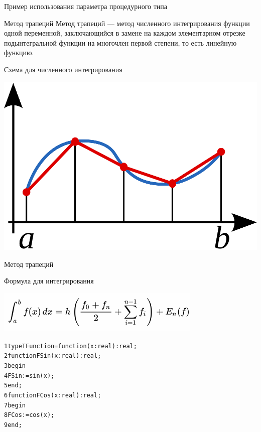 \documentclass{beamer}
\begin{document}
\begin{frame}[fragile]{Пример использования параметра процедурного типа}
\begin{block}{Метод трапеций}
Метод трапеций — метод численного интегрирования функции одной переменной, заключающийся в замене на каждом элементарном отрезке подынтегральной функции на многочлен первой степени, то есть линейную функцию. 
\end{block}
\begin{block}{Схема для численного интегрирования}
\begin{center}
\includegraphics[scale=0.15]{images/trap.png}
\end{center}
\end{block}
\end{frame}

\begin{frame}[fragile]{Метод трапеций}
\begin{block}{Формула для интегрирования}
\begin{center}
\includegraphics[scale=0.5]{images/formula.png}
\end{center}
\end{block}
\begin{alltt}
 1 type TFunction = function(x:real):real;
 2 function FSin(x: real):real;
 3 begin
 4   FSin := sin(x);
 5 end;
 6 function FCos(x: real):real;
 7 begin
 8   FCos := cos(x);
 9 end;
\end{alltt}
\end{frame}
\end{document}
